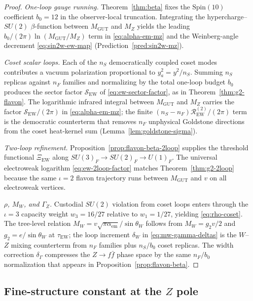 \documentclass[11pt]{article}
\theoremstyle{plain}
\theoremstyle{definition}
\theoremstyle{remark}
\numberwithin{equation}{section}
\newcommand{\Spin}{\mathrm{Spin}}
\begin{document}
\begin{proof}
\emph{One-loop gauge running.}
Theorem~\ref{thm:beta} fixes the $\Spin(10)$ coefficient $b_0=12$ in the
observer-local truncation. Integrating the hypercharge--$SU(2)$ $\beta$-function
between $M_{\mathrm{GUT}}$ and $M_Z$ yields the leading
$b_0/(2\pi)\ln(M_{\mathrm{GUT}}/M_Z)$ term in \eqref{eq:alpha-em-mz} and the
Weinberg-angle decrement \eqref{eq:sin2w-ew-map}
(Prediction~\ref{pred:sin2w-mz}).

\emph{Coset scalar loops.}
Each of the $n_S$ democratically coupled coset modes contributes a vacuum
polarization proportional to $y_a^2= y^2/n_S$. Summing $n_S$ replicas against
$n_F$ families and normalizing by the total one-loop budget $b_0$ produces the
sector factor $\mathcal{S}_{\mathrm{EW}}$ of \eqref{eq:ew-sector-factor}, as in
Theorem~\ref{thm:g2-flavon}. The logarithmic infrared integral between
$M_{\mathrm{GUT}}$ and $M_Z$ carries the factor
$\mathcal{S}_{\mathrm{EW}}/(2\pi)$ in \eqref{eq:alpha-em-mz}; the finite
$(n_S-n_F)\mathcal{R}_{\mathrm{EW}}^{(2)}/(2\pi)$ term is the democratic
counterterm that removes $n_F$ unphysical Goldstone directions from the coset
heat-kernel sum (Lemma~\ref{lem:goldstone-sigma}).

\emph{Two-loop refinement.}
Proposition~\ref{prop:flavon-beta-2loop} supplies the threshold functional
$\Xi_{\mathrm{EW}}$ along $SU(3)_F\to SU(2)_F\to U(1)_F$. The universal
electroweak logarithm \eqref{eq:ew-2loop-factor} matches
Theorem~\ref{thm:g2-2loop} because the same $\iota=2$ flavon trajectory
runs between $M_{\mathrm{GUT}}$ and $v$ on all electroweak vertices.

\emph{$\rho$, $M_W$, and $\Gamma_Z$.}
Custodial $SU(2)$ violation from coset loops enters through the $\iota=3$
capacity weight $w_3=16/27$ relative to $w_1=1/27$, yielding
\eqref{eq:rho-coset}. The tree-level relation
$M_W=v\sqrt{\pi\alpha_{\mathrm{em}}}/\sin\theta_W$ follows from
$M_W=g_2 v/2$ and $g_2=e/\sin\theta_W$ at $\tau_{\mathrm{EW}}$; the loop
increment $\delta_W$ in \eqref{eq:mw-gamma-deltas} is the $W$--$Z$ mixing
counterterm from $n_F$ families plus $n_S/b_0$ coset replicas.
The width correction $\delta_\Gamma$ compresses the $Z\to f\bar f$ phase space
by the same $n_F/b_0$ normalization that appears in
Proposition~\ref{prop:flavon-beta}.
\end{proof}

\subsection{Fine-structure constant at the \texorpdfstring{$Z$}{Z} pole}
\label{sec:ew-precision:alpha}
\end{document}
